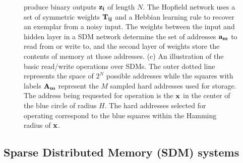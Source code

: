 \documentclass[10pt,letterpaper]{article}
\begin{document}
\begin{figure}[h!]
\begin{center}
{      produce binary outputs $\bf{z}_{i}$ of length $N$. The Hopfield
      network uses a set of symmetric weights $\bf{T}_{ij}$ and a
      Hebbian learning rule to recover an exemplar from a noisy
      input. The weights between the input and hidden layer in a SDM
      network determine the set of addresses $\bf{a}_{m}$ to read from
      or write to, and the second layer of weights store the contents
      of memory at those addresses. (c) An illustration of the basic
      read/write operations over SDMs. The outer dotted line
      represents the space of $2^{N}$ possible addresses while the
      squares with labels $\bf{A}_{m}$ represent the $M$ sampled hard
      addresses used for storage. The address being requested for
      operation is the $\bf{x}$ in the center of the blue circle of
      radius $H$. The hard addresses selected for operating correspond
      to the blue squares within the Hamming radius of $\bf{x}$.}
\label{neuralNets}
\end{center}
\end{figure}


\subsection{Sparse Distributed Memory (SDM) systems}
\end{document}
